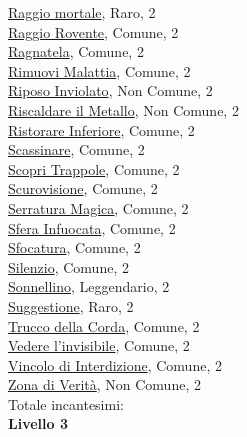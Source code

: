 \begin{multicols}{3}
{{\hyperlink{Raggio mortale}{Raggio mortale}, Raro, 2\\
\hyperlink{Raggio Rovente}{Raggio Rovente}, Comune, 2\\
\hyperlink{Ragnatela}{Ragnatela}, Comune, 2\\
\hyperlink{Rimuovi Malattia}{Rimuovi Malattia}, Comune, 2\\
\hyperlink{Riposo Inviolato}{Riposo Inviolato}, Non Comune, 2\\
\hyperlink{Riscaldare il Metallo}{Riscaldare il Metallo}, Non Comune, 2\\
\hyperlink{Ristorare Inferiore}{Ristorare Inferiore}, Comune, 2\\
\hyperlink{Scassinare}{Scassinare}, Comune, 2\\
\hyperlink{Scopri Trappole}{Scopri Trappole}, Comune, 2\\
\hyperlink{Scurovisione}{Scurovisione}, Comune, 2\\
\hyperlink{Serratura Magica}{Serratura Magica}, Comune, 2\\
\hyperlink{Sfera Infuocata}{Sfera Infuocata}, Comune, 2\\
\hyperlink{Sfocatura}{Sfocatura}, Comune, 2\\
\hyperlink{Silenzio}{Silenzio}, Comune, 2\\
\hyperlink{Sonnellino}{Sonnellino}, Leggendario, 2\\
\hyperlink{Suggestione}{Suggestione}, Raro, 2\\
\hyperlink{Trucco della Corda}{Trucco della Corda}, Comune, 2\\
\hyperlink{Vedere l'invisibile}{Vedere l'invisibile}, Comune, 2\\
\hyperlink{Vincolo di Interdizione}{Vincolo di Interdizione}, Comune, 2\\
\hyperlink{Zona di Verità}{Zona di Verità}, Non Comune, 2\\

\medskip Totale incantesimi: \theinclvdue\\

\textbf{Livello 3}  

}}
\end{multicols}
